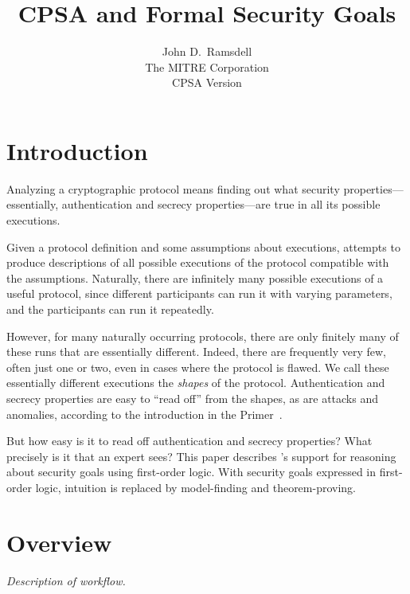 \documentclass[12pt]{article}
\title{CPSA and Formal Security Goals}
\author{John D.~Ramsdell\\
  The MITRE Corporation\\ CPSA Version \version}
\begin{document}
\maketitle
\cpsacopying

\tableofcontents

\listoffigures

\listoftables

\newpage

\nocite{Ramsdell12,GuttmanLiskovRowe14,Guttman14}

\section{Introduction}

\begin{sloppypar}
Analyzing a cryptographic protocol means finding out what security
properties---essentially, authentication and secrecy properties---are
true in all its possible executions.
\end{sloppypar}

Given a protocol definition and some assumptions about executions,
{\cpsa} attempts to produce descriptions of all possible executions of
the protocol compatible with the assumptions.  Naturally, there are
infinitely many possible executions of a useful protocol, since
different participants can run it with varying parameters, and the
participants can run it repeatedly.

However, for many naturally occurring protocols, there are only
finitely many of these runs that are essentially different.  Indeed,
there are frequently very few, often just one or two, even in cases
where the protocol is flawed.  We call these essentially different
executions the \emph{shapes} of the protocol.  Authentication and
secrecy properties are easy to ``read off'' from the shapes, as are
attacks and anomalies, according to the introduction in the {\cpsa}
Primer~\cite{cpsaprimer09}.

But how easy is it to read off authentication and secrecy properties?
What precisely is it that an expert sees?  This paper describes
{\cpsa}'s support for reasoning about security goals using first-order
logic.  With security goals expressed in first-order logic, intuition
is replaced by model-finding and theorem-proving.

\section{Overview}

\emph{Description of workflow.}




\printindex
\end{document}
